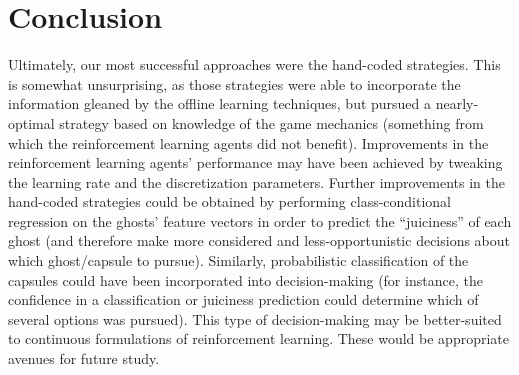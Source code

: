\documentclass[11pt]{amsart}
\begin{document}
\section{Conclusion}

Ultimately, our most successful approaches were the hand-coded strategies. This is somewhat unsurprising, as those strategies were able to incorporate the information gleaned by the offline learning techniques, but pursued a nearly-optimal strategy based on knowledge of the game mechanics (something from which the reinforcement learning agents did not benefit). Improvements in the reinforcement learning agents' performance may have been achieved by tweaking the learning rate and the discretization parameters. Further improvements in the hand-coded strategies could be obtained by performing class-conditional regression on the ghosts' feature vectors in order to predict the ``juiciness'' of each ghost (and therefore make more considered and less-opportunistic decisions about which ghost/capsule to pursue). Similarly, probabilistic classification of the capsules could have been incorporated into decision-making (for instance, the confidence in a classification or juiciness prediction could determine which of several options was pursued). This type of decision-making may be better-suited to continuous formulations of reinforcement learning. These would be appropriate avenues for future study.
\end{document}
